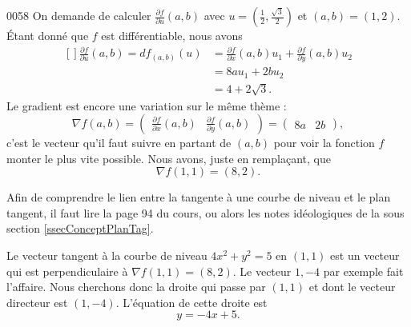 \begin{corrige}{0058}
On demande de calculer $\frac{ \partial f }{ \partial u }(a,b)$ avec $u=(\frac{ 1 }{2},\frac{ \sqrt{3} }{2})$ et $(a,b)=(1,2)$. Étant donné que $f$ est différentiable, nous avons
\begin{equation}
	\begin{aligned}[]
	\frac{ \partial f }{ \partial u }(a,b)=df_{(a,b)}(u)&=\frac{ \partial f }{ \partial x }(a,b)u_1+\frac{ \partial f }{ \partial y }(a,b)u_2\\
			&=8au_1+2bu_2\\
			&=4+2\sqrt{3}.
	\end{aligned}
\end{equation}
Le gradient est encore une variation sur le même thème :
\begin{equation}
	\nabla f(a,b)=\begin{pmatrix} 
	\frac{ \partial f }{ \partial x }(a,b)	&	\frac{ \partial f }{ \partial y }(a,b)	
\end{pmatrix}=\begin{pmatrix} 
	8a	&	2b	
\end{pmatrix},
\end{equation}
c'est le vecteur qu'il faut suivre en partant de $(a,b)$ pour voir la fonction $f$ monter le plus vite possible. Nous avons, juste en remplaçant, que
\begin{equation}
	\nabla f(1,1)=(8,2).
\end{equation}

Afin de comprendre le lien entre la tangente à une courbe de niveau et le plan tangent, il faut lire la page 94 du cours, ou alors les notes idéologiques de la sous section \ref{ssecConceptPlanTag}. 

Le vecteur tangent à la courbe de niveau $4x^2+y^2=5$ en $(1,1)$ est un vecteur qui est perpendiculaire à $\nabla f(1,1)=(8,2)$. Le vecteur $1,-4$ par exemple fait l'affaire. Nous cherchons donc la droite qui passe par $(1,1)$ et dont le vecteur directeur est $(1,-4)$. L'équation de cette droite est
\begin{equation}
	y=-4x+5.
\end{equation}


\end{corrige}

